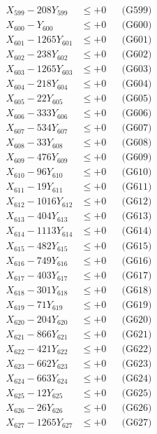 \documentclass[a4paper,10pt]{article}
\begin{document}
{\begin{align}
X_{599} - 208Y_{599} &\leq +0 && \text{(G599)} \\
X_{600} - Y_{600} &\leq +0 && \text{(G600)} \\
\allowbreak
X_{601} - 1265Y_{601} &\leq +0 && \text{(G601)} \\
X_{602} - 238Y_{602} &\leq +0 && \text{(G602)} \\
X_{603} - 1265Y_{603} &\leq +0 && \text{(G603)} \\
X_{604} - 218Y_{604} &\leq +0 && \text{(G604)} \\
X_{605} - 22Y_{605} &\leq +0 && \text{(G605)} \\
X_{606} - 333Y_{606} &\leq +0 && \text{(G606)} \\
X_{607} - 534Y_{607} &\leq +0 && \text{(G607)} \\
X_{608} - 33Y_{608} &\leq +0 && \text{(G608)} \\
X_{609} - 476Y_{609} &\leq +0 && \text{(G609)} \\
X_{610} - 96Y_{610} &\leq +0 && \text{(G610)} \\
\allowbreak
X_{611} - 19Y_{611} &\leq +0 && \text{(G611)} \\
X_{612} - 1016Y_{612} &\leq +0 && \text{(G612)} \\
X_{613} - 404Y_{613} &\leq +0 && \text{(G613)} \\
X_{614} - 1113Y_{614} &\leq +0 && \text{(G614)} \\
X_{615} - 482Y_{615} &\leq +0 && \text{(G615)} \\
X_{616} - 749Y_{616} &\leq +0 && \text{(G616)} \\
X_{617} - 403Y_{617} &\leq +0 && \text{(G617)} \\
X_{618} - 301Y_{618} &\leq +0 && \text{(G618)} \\
X_{619} - 71Y_{619} &\leq +0 && \text{(G619)} \\
X_{620} - 204Y_{620} &\leq +0 && \text{(G620)} \\
\allowbreak
X_{621} - 866Y_{621} &\leq +0 && \text{(G621)} \\
X_{622} - 421Y_{622} &\leq +0 && \text{(G622)} \\
X_{623} - 662Y_{623} &\leq +0 && \text{(G623)} \\
X_{624} - 663Y_{624} &\leq +0 && \text{(G624)} \\
X_{625} - 12Y_{625} &\leq +0 && \text{(G625)} \\
X_{626} - 26Y_{626} &\leq +0 && \text{(G626)} \\
X_{627} - 1265Y_{627} &\leq +0 && \text{(G627)} \\

\end{align}}
\end{document}
